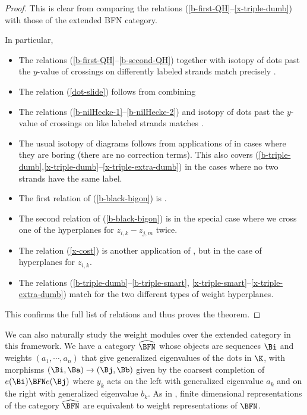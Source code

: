 \begin{proof}
  This is clear from comparing the relations
  (\ref{b-first-QH}--\ref{x-triple-dumb}) with those of the extended
  BFN category.
  
  In particular, \begin{itemize}
      \item The relations (\ref{b-first-QH}--\ref{b-second-QH}) together with isotopy of dots past the $y$-value of crossings on differently labeled strands match precisely \cite[(3.1e)]{WebSD}.
            \item The relation (\ref{dot-slide}) follows from combining \cite[(3.1e)\& (3.2c)]{WebSD} 
      \item  The relations (\ref{b-nilHecke-1}--\ref{b-nilHecke-2}) and isotopy of dots past the $y$-value of crossings on like labeled strands matches \cite[(3.4d)]{WebSD}.

      \item The usual isotopy of diagrams follows from applications of \cite[(3.1d) \& (3.4e)]{WebSD} in cases where they are boring (there are no correction terms).  This also covers (\ref{b-triple-dumb},\ref{x-triple-dumb}--\ref{x-triple-extra-dumb}) in the cases where no two strands have the same label.
      \item The first relation of (\ref{b-black-bigon}) is \cite[(3.4a)]{WebSD}.
      \item The second relation of (\ref{b-black-bigon}) is \cite[(3.1d)]{WebSD} in the special case where we cross one of the hyperplanes for $z_{i,k}-z_{j,m}$ twice.
         \item The relation (\ref{x-cost}) is another application of \cite[(3.1d)]{WebSD}, but in the case of hyperplanes for $z_{i,k}$.  
      \item The relations (\ref{b-triple-dumb}--\ref{b-triple-smart}, \ref{x-triple-smart}--\ref{x-triple-extra-dumb}) match \cite[(3.4e)]{WebSD} for the two different types of weight hyperplanes.
  \end{itemize}
  This confirms the full list of relations and thus proves the theorem.
\end{proof}
We can also naturally study the weight modules over the extended category in
this framework.  We have a category $\widehat{\BFN}$ whose objects are sequences $\Bi$
and weights $(a_1,\cdots,a_n)$ that give generalized eigenvalues of
the dots in $\K$, with morphisms $(\Bi,\Ba)\to (\Bj,\Bb)$  given by
the coarsest completion of $e(\Bi)\BFN e(\Bj)$ where $y_k$ acts on the
left with generalized eigenvalue $a_k$ and on the right with
generalized eigenvalue $b_k$.  As in \cite{WebSD}, finite dimensional representations of
the category $\widehat{\BFN}$ are equivalent to weight representations of $\BFN$.

